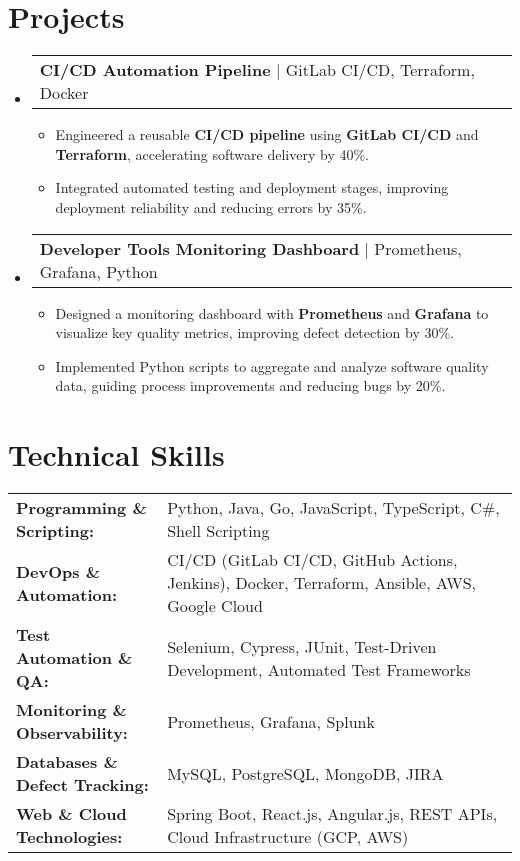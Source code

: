 \documentclass[letterpaper,11pt]{article}
\makeatletter
\newcommand{\resumeItem}[1]{
  \item\footnotesize{
    {#1 \vspace{-2pt}}
  }
}
\newcommand{\resumeProjectHeading}[2]{
    \item
    \begin{tabular*}{1.001\textwidth}{l@{\extracolsep{\fill}}r}
      \small#1 & \textbf{\small #2}\\
    \end{tabular*}\vspace{-7pt}
}
\newcommand{\resumeSubHeadingListStart}{\begin{itemize}[leftmargin=0pt, label={}]}
\newcommand{\resumeSubHeadingListEnd}{\end{itemize}}
\newcommand{\resumeItemListStart}{\begin{itemize}[leftmargin=*]}
\newcommand{\resumeItemListEnd}{\end{itemize}\vspace{-5pt}}
\makeatother
\begin{document}
\section{Projects}
    \vspace{-5pt}
    \resumeSubHeadingListStart
      \resumeProjectHeading
          {\textbf{CI/CD Automation Pipeline} | GitLab CI/CD, Terraform, Docker}
          {}
          \resumeItemListStart
              \resumeItem{Engineered a reusable \textbf{CI/CD pipeline} using \textbf{GitLab CI/CD} and \textbf{Terraform}, accelerating software delivery by 40\%.}
              \resumeItem{Integrated automated testing and deployment stages, improving deployment reliability and reducing errors by 35\%.}
          \resumeItemListEnd
          \vspace{-16pt}
      \resumeProjectHeading
          {\textbf{Developer Tools Monitoring Dashboard} | Prometheus, Grafana, Python}
          {}
          \resumeItemListStart
              \resumeItem{Designed a monitoring dashboard with \textbf{Prometheus} and \textbf{Grafana} to visualize key quality metrics, improving defect detection by 30\%.}
              \resumeItem{Implemented Python scripts to aggregate and analyze software quality data, guiding process improvements and reducing bugs by 20\%.}
          \resumeItemListEnd
          \vspace{-16pt}
    \resumeSubHeadingListEnd
\vspace{-10pt}
\section{Technical Skills}
        \vspace{-14pt}
        \begin{table}[h]
            \footnotesize
            \begin{tabular}{p{0.3\linewidth} p{0.7\linewidth}}
                \textbf{Programming \& Scripting:} & Python, Java, Go, JavaScript, TypeScript, C\#, Shell Scripting \\
                \textbf{DevOps \& Automation:} & CI/CD (GitLab CI/CD, GitHub Actions, Jenkins), Docker, Terraform, Ansible, AWS, Google Cloud \\
                \textbf{Test Automation \& QA:} & Selenium, Cypress, JUnit, Test-Driven Development, Automated Test Frameworks \\
                \textbf{Monitoring \& Observability:} & Prometheus, Grafana, Splunk \\
                \textbf{Databases \& Defect Tracking:} & MySQL, PostgreSQL, MongoDB, JIRA \\
                \textbf{Web \& Cloud Technologies:} & Spring Boot, React.js, Angular.js, REST APIs, Cloud Infrastructure (GCP, AWS) \\
            \end{tabular}
        \end{table}
\end{document}
